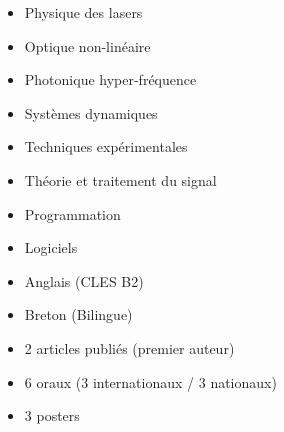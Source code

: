 

\vspace{-0.1em}



\begin{itemize}
	\item {Physique des lasers}
	\item {Optique non-linéaire}
	\item {Photonique hyper-fréquence}
	\item {Systèmes dynamiques}
	\item {Techniques expérimentales}
	\item {Théorie et traitement du signal}
\end{itemize}

\divider


\begin{itemize}
\item Programmation

\smallskip
{}	

\medskip

\item Logiciels

\smallskip
{}
\end{itemize}

\divider


\begin{itemize}

\item Anglais (CLES B2)
\item Breton (Bilingue)

\end{itemize}

\medskip
{}

\begin{itemize}
	\item 2 articles publiés (premier auteur)
\end{itemize}

\begin{itemize}
	\item 6 oraux (3 internationaux / 3 nationaux)
	\item 3 posters
\end{itemize}

